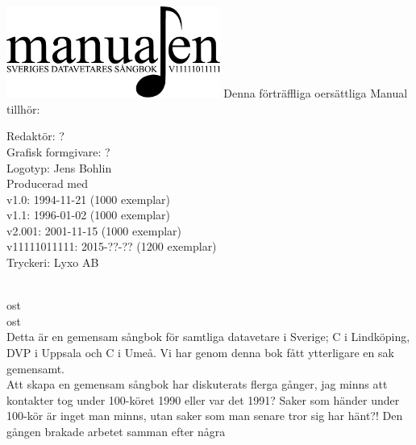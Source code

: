 \documentclass[a6paper,fontsize=10pt,twoside,openright]{scrbook}
\begin{document}
\setlength{\parindent}{15pt}
\vspace*{6.5cm}
\hspace*{1cm}
\includegraphics[keepaspectratio,width=7cm]{elements/logo.pdf}
\clearpage
\noindent Denna förträffliga oersättliga Manual tillhör:
\ohead{\textsc{\scriptsize\leftmark}}
\ofoot[\pagemark]{\scriptsize\pagemark}
\clearpage
\null
\clearpage
{}
\null
\vfill
    {\noindent\small\centering
      Redaktör: ?\\
      Grafisk formgivare: ?\\
      Logotyp: Jens Bohlin\\
      Producerad med \XeTeX\\
      v1.0: 1994-11-21 (1000 exemplar)\\
      v1.1: 1996-01-02 (1000 exemplar)\\
      v2.001: 2001-11-15 (1000 exemplar)\\
      v11111011111: 2015-??-?? (1200 exemplar)\\
      Tryckeri: Lyxo AB\par
    }
\restoregeometry
\cleardoublepage
\\
\indent ost
\cleardoublepage
{}\\
\indent ost
\cleardoublepage
{}\\
\indent Detta är en gemensam sångbok för samtliga datavetare i
Sverige; C i Lindköping, DVP i Uppsala och C i Umeå. Vi har genom
denna bok fått ytterligare en sak gemensamt.\\ \indent Att skapa en
gemensam sångbok har diskuterats flerga gånger, jag minns att
kontakter tog under 100-köret 1990 eller var det 1991?  Saker som
händer under 100-kör är inget man minns, utan saker som man senare
tror sig har hänt?! Den gången brakade arbetet samman efter några
\end{document}
